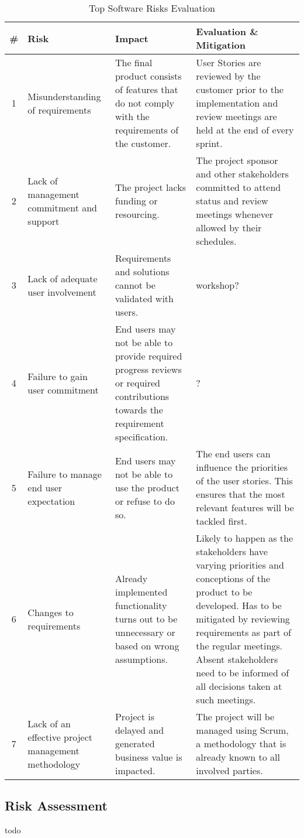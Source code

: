 \begin{table}[H]
\begin{tabular}{|c|p{80pt} p{140pt} p{140pt}|}
\hline \# & Risk & Impact & Evaluation \& Mitigation \\ 
\hline 1 & Misunderstanding of requirements & The final product consists of features that do not comply with the requirements of the customer. & User Stories are reviewed by the customer prior to the implementation and review meetings are held at the end of every sprint. \\ 
2 & Lack of management commitment and support & The project lacks funding or resourcing. & The project sponsor and other stakeholders committed to attend status and review meetings whenever allowed by their schedules. \\ 
3 & Lack of adequate user involvement & Requirements and solutions cannot be validated with users. & workshop? \\ 
4 & Failure to gain user commitment & End users may not be able to provide required progress reviews or required contributions towards the requirement specification. & ? \\ 
5 & Failure to manage end user expectation & End users may not be able to use the product or refuse to do so. & The end users can influence the priorities of the user stories. This ensures that the most relevant features will be tackled first. \\ 
6 & Changes to requirements & Already implemented functionality turns out to be unnecessary or based on wrong assumptions. & Likely to happen as the stakeholders have varying priorities and conceptions of the product to be developed. Has to be mitigated by reviewing requirements as part of the regular meetings. Absent stakeholders need to be informed of all decisions taken at such meetings. \\ 
7 & Lack of an effective project management methodology & Project is delayed and generated business value is impacted. & The project will be managed using Scrum, a methodology that is already known to all involved parties. \\ 
\hline 
\end{tabular} 
\caption{Top Software Risks Evaluation}
\label{tab:toprisks}
\end{table}

\subsection{Risk Assessment}


todo


